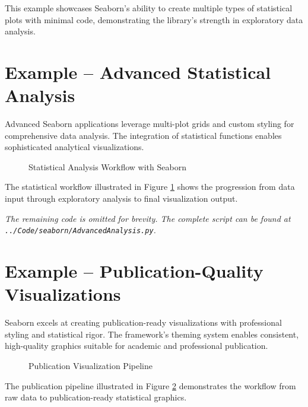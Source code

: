 This example showcases Seaborn's ability to create multiple types of statistical plots with minimal code, demonstrating the library's strength in exploratory data analysis.

\section{Example -- Advanced Statistical Analysis}
\label{sec:advanced_example}

Advanced Seaborn applications leverage multi-plot grids and custom styling for comprehensive data analysis. The integration of statistical functions enables sophisticated analytical visualizations.

\clearpage

\begin{figure}[htbp]
	\centering
    
	\caption{Statistical Analysis Workflow with Seaborn}
	\label{fig:statistical_workflow}
\end{figure}

The statistical workflow illustrated in Figure \ref{fig:statistical_workflow} shows the progression from data input through exploratory analysis to final visualization output.


\noindent\textit{The remaining code is omitted for brevity. The complete script can be found at \texttt{../Code/seaborn/AdvancedAnalysis.py}.}

\section{Example -- Publication-Quality Visualizations}
\label{sec:publication_example}

Seaborn excels at creating publication-ready visualizations with professional styling and statistical rigor. The framework's theming system enables consistent, high-quality graphics suitable for academic and professional publication.

\begin{figure}[htbp]
	\centering
    
	\caption{Publication Visualization Pipeline}
	\label{fig:publication_pipeline}
\end{figure}

The publication pipeline illustrated in Figure \ref{fig:publication_pipeline} demonstrates the workflow from raw data to publication-ready statistical graphics.

